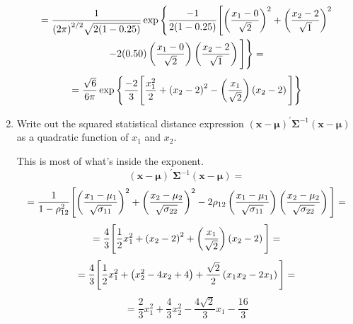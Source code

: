 \begin{enumerate}[label=(\alph*)]
    \begin{multline*}
        =
        \frac{1}{{(2\pi)}^{2/2}\sqrt{2(1-0.25)}}
        \exp
        \Bigg{\{}
            \frac{-1}{2(1-0.25)}
            \Bigg{[}
                {\left(\frac{x_1 - 0}{\sqrt{2}}\right)}^{2}
                +
                {\left(\frac{x_2 - 2}{\sqrt{1}}\right)}^{2} \\
                -
                2(0.50)
                \left(\frac{x_1 - 0}{\sqrt{2}}\right)
                \left(\frac{x_2 - 2}{\sqrt{1}}\right)
            \Bigg{]}
        \Bigg{\}}
        =
    \end{multline*}
    \[
        =
        \frac{\sqrt{6}}{6\pi}
        \exp
        \Bigg{\{}
            \frac{-2}{3}
            \Bigg{[}
                {\frac{x_1^2}{2}}
                +
                {\left(x_2 - 2\right)}^{2}
                -
                \left(\frac{x_1}{\sqrt{2}}\right)
                \left(x_2 - 2\right)
            \Bigg{]}
        \Bigg{\}}
    \]
    \item Write out the squared statistical distance expression ${(\textbf{x} - \bm{\mu})}^{\prime}\bm{\Sigma}^{-1}{(\textbf{x} - \bm{\mu})}$ as a quadratic
    function of $x_1$ and $x_2$.
    \par
    This is most of what's inside the exponent.
    \[
        {(\textbf{x} - \bm{\mu})}^{\prime}\bm{\Sigma}^{-1}{(\textbf{x} - \bm{\mu})}
        =
    \]
    \[
        =
        \frac{1}{1-\rho_{12}^2}
        \Bigg{[}
            {\left(\frac{x_1 - \mu_1}{\sqrt{\sigma_{11}}}\right)}^{2}
            +
            {\left(\frac{x_2 - \mu_2}{\sqrt{\sigma_{22}}}\right)}^{2} \\
            -
            2\rho_{12}
            \left(\frac{x_1 - \mu_1}{\sqrt{\sigma_{11}}}\right)
            \left(\frac{x_2 - \mu_2}{\sqrt{\sigma_{22}}}\right)
        \Bigg{]}
        =
    \]
    \[
        =
        \frac{4}{3}
        \Bigg{[}
            \frac{1}{2}x_1^2
            +
            {\left(x_2 - 2\right)}^{2}
            +
            \left(\frac{x_1}{\sqrt{2}}\right)
            \left(x_2 - 2\right)
        \Bigg{]}
        =
    \]
    \[
        =
        \frac{4}{3}
        \Bigg{[}
            \frac{1}{2}x_1^2
            +
            {\left(x_2^2 - 4x_2 + 4\right)}
            +
            \frac{\sqrt{2}}{2}
            \left(x_1x_2 - 2x_1\right)
        \Bigg{]}
        =
    \]
    \[
        =
        \frac{2}{3}
        x_1^2
        +
        \frac{4}{3}
        x_2^2
        -
        \frac{4\sqrt{2}}{3}
        x_1
        -
        \frac{16}{3}
\]
\end{enumerate}

